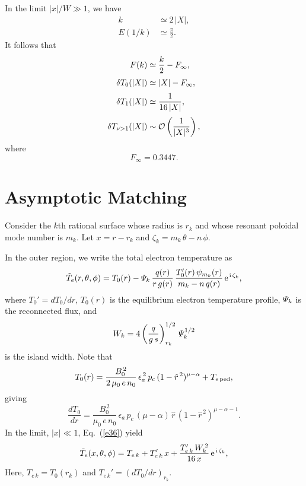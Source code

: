 \documentclass[12pt,prb,aps,notitlepage]{revtex4-1}
\begin{document}
In the limit $|x|/W\gg 1$, we have
\begin{align}
k&\simeq 2\,|X|,\\[0.5ex]
E(1/k) &\simeq \frac{\pi}{2}.
\end{align}
It follows that 
\begin{align}
F(k) &\simeq \frac{k}{2} - F_\infty,\\[0.5ex]
\delta T_0(|X|)&\simeq |X| - F_\infty,\\[0.5ex]
\delta T_1(|X|) &\simeq \frac{1}{16\,|X|},\\[0.5ex]
\delta T_{\nu>1}(|X|)& \sim {\cal O}\left(\frac{1}{|X|^3}\right),
\end{align}
where
\begin{equation}
F_\infty = 0.3447.
\end{equation}

\section{Asymptotic Matching}
Consider the $k$th rational surface whose radius is $r_k$ and whose resonant poloidal mode number is $m_k$. Let  $x=r-r_k$ and $\zeta_k=m_k\,\theta-n\,\phi$. 

 In the outer region,  we write the total electron temperature as 
\begin{equation}\label{e36}
\tilde{T}_e(r, \theta,\phi)=T_0(r) - {\mit\Psi}_k\,\frac{q(r)}{r\,g(r)}\,\frac{T_0'(r)\,\psi_{m_k}(r)}{m_k-n\,q(r)}\,{\rm e}^{\,{\rm i}\,\zeta_k},
\end{equation}
where $T_0'=dT_0/dr$, $T_0(r)$ is the equilibrium electron temperature profile, ${\mit\Psi}_k$ is the reconnected flux, and 
\begin{equation}
W_k = 4\left(\frac{q}{g\,s}\right)^{1/2}_{r_k}\,{\mit\Psi}_k^{1/2}
\end{equation}
is the island width. Note that 
\begin{equation}
T_0(r) = \frac{B_0^{\,2}}{2\,\mu_0\,e\,n_0}\,\epsilon_a^{\,2}\,p_c\,(1-\hat{r}^{\,2})^{\mu-\alpha} + T_{e\,{\rm ped}},
\end{equation}
giving
\begin{equation}
\frac{dT_0}{dr} =  \frac{B_0^{\,2}}{\mu_0\,e\,n_0}\,\epsilon_a\,p_c\,(\mu-\alpha)\,\hat{r}\,(1-\hat{r}^{\,2})^{\mu-\alpha-1}.
\end{equation}
 In the limit, $|x|\ll 1$, Eq.~(\ref{e36}) yield 
\begin{equation}
\tilde{T}_e(x, \theta,\phi)=T_{e\,k} + T_{e\,k}'\,x + \frac{T_{e\,k}'\,W_k^{\,2}}{16\,x}\,{\rm e}^{\,{\rm i}\,\zeta_k},
\end{equation}
Here, $T_{e\,k}=T_0(r_k)$ and $T_{e\,k}'= (dT_0/dr)_{r_k}$. 
\end{document}
